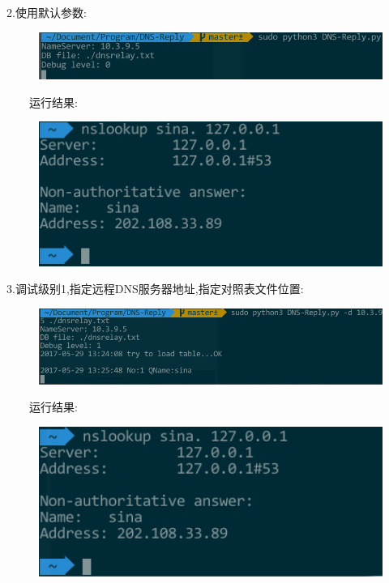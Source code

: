 \documentclass{ctexart}
\begin{document}
2.使用默认参数:
\begin{figure}[H]
  \centering
  \includegraphics[width=15cm]{img/default.png}
\end{figure}

\ \ \ \ 运行结果:
\begin{figure}[H]
  \centering
  \includegraphics[width=15cm]{img/default-result.png}
\end{figure}

3.调试级别1,指定远程DNS服务器地址,指定对照表文件位置:
\begin{figure}[H]
  \centering
  \includegraphics[width=15cm]{img/debug-level-1.png}
\end{figure}

\pagebreak[4]

\ \ \ \ 运行结果:
\begin{figure}[H]
  \centering
  \includegraphics[width=15cm]{img/debug-level-1-result.png}
\end{figure}
\end{document}

